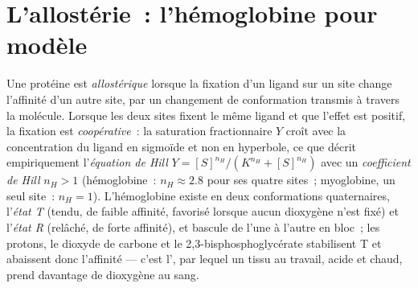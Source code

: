 \section{L'allostérie~: l'hémoglobine pour modèle}

\begin{definition}\label{def:b3:structural-biology:allostery}
Une protéine est \emph{allostérique} lorsque la fixation d'un ligand
sur un site change l'affinité d'un autre site, par un changement de
conformation transmis à travers la molécule. Lorsque les deux sites
fixent le même ligand et que l'effet est positif, la fixation est
\emph{coopérative}~: la saturation fractionnaire $Y$ croît avec la
concentration du ligand en sigmoïde et non en hyperbole, ce que décrit
empiriquement l'\emph{équation de Hill} $Y = [S]^{n_{H}}/(K^{n_{H}} +
[S]^{n_{H}})$ avec un \emph{coefficient de Hill} $n_{H} > 1$
(hémoglobine~: $n_{H} \approx 2.8$ pour ses quatre sites~; myoglobine,
un seul site~: $n_{H} =
1$). L'hémoglobine existe en deux conformations quaternaires,
l'\emph{état T} (tendu, de faible affinité, favorisé lorsque aucun
dioxygène n'est fixé) et l'\emph{état R} (relâché, de forte affinité),
et bascule de l'une à l'autre en bloc~; les protons, le dioxyde de
carbone et le 2,3-bisphosphoglycérate stabilisent T et abaissent donc
l'affinité --- c'est l', par lequel un tissu au travail,
acide et chaud, prend davantage de dioxygène au sang.
\end{definition}

